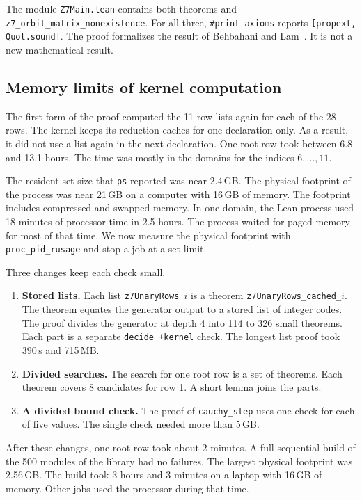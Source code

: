 \documentclass{article}
\theoremstyle{plain}
\theoremstyle{definition}
\numberwithin{equation}{section}
\begin{document}
The module \texttt{Z7Main.lean} contains both theorems and \texttt{z7\_orbit\_matrix\_nonexistence}. For all three, \texttt{\#print axioms} reports \texttt{[propext, Quot.sound]}. The proof formalizes the result of Behbahani and Lam~\cite{behbahani2011strongly}. It is not a new mathematical result.

\subsection{Memory limits of kernel computation}
\label{sec:resources}

The first form of the proof computed the 11 row lists again for each of the 28 rows. The kernel keeps its reduction caches for one declaration only. As a result, it did not use a list again in the next declaration. One root row took between 6.8 and 13.1 hours. The time was mostly in the domains for the indices $6, \dots, 11$.

The resident set size that \texttt{ps} reported was near 2.4\,GB. The physical footprint of the process was near 21\,GB on a computer with 16\,GB of memory. The footprint includes compressed and swapped memory. In one domain, the Lean process used 18 minutes of processor time in 2.5 hours. The process waited for paged memory for most of that time. We now measure the physical footprint with \texttt{proc\_pid\_rusage} and stop a job at a set limit.

Three changes keep each check small.
\begin{enumerate}
 \item \textbf{Stored lists.} Each list \texttt{z7UnaryRows}~$i$ is a theorem \texttt{z7UnaryRows\_cached\_$i$}. The theorem equates the generator output to a stored list of integer codes. The proof divides the generator at depth 4 into 114 to 326 small theorems. Each part is a separate \texttt{decide +kernel} check. The longest list proof took 390\,s and 715\,MB.
 \item \textbf{Divided searches.} The search for one root row is a set of theorems. Each theorem covers 8 candidates for row 1. A short lemma joins the parts.
 \item \textbf{A divided bound check.} The proof of \texttt{cauchy\_step} uses one check for each of five values. The single check needed more than 5\,GB.
\end{enumerate}
After these changes, one root row took about 2 minutes.
A full sequential build of the 500 modules of the library had no failures. The largest physical footprint was 2.56\,GB. The build took 3 hours and 3 minutes on a laptop with 16\,GB of memory. Other jobs used the processor during that time.
\end{document}
